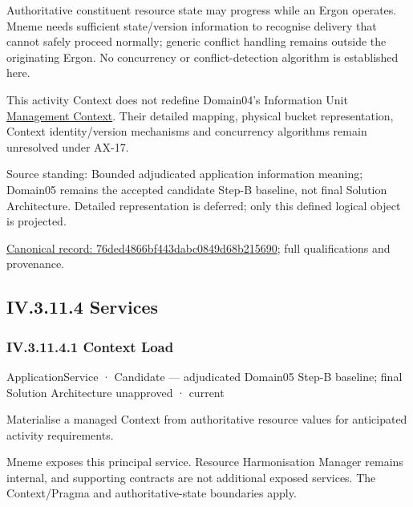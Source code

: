 Authoritative constituent resource state may progress while an Ergon operates.
Mneme needs sufficient state/version information to recognise delivery that cannot
safely proceed normally; generic conflict handling remains outside the originating
Ergon. No concurrency or conflict-detection algorithm is established here.



This activity Context does not redefine Domain04's Information Unit
\href{\detokenize{../../../../../docs/markdown/04-information-architecture/metamodel/information-architecture-metamodel.md#65-context}}{Management Context}.
Their detailed mapping, physical bucket representation, Context identity/version
mechanisms and concurrency algorithms remain unresolved under AX-17.



Source standing: Bounded adjudicated application information meaning; Domain05 remains the accepted candidate Step-B baseline, not final Solution Architecture. Detailed representation is deferred; only this defined logical object is projected.


{\footnotesize \href{../../../../continuum/application/data-object/76ded4866bf443dabc0849d68b215690.md}{Canonical record: 76ded4866bf443dabc0849d68b215690}; full qualifications and provenance.}\par
\subsection*{IV.3.11.4 Services}
\label{navigation:IV.3.11.4}

\subsubsection*{IV.3.11.4.1 Context Load}
\label{navigation:IV.3.11.4.1}

\label{element:1ccfe420541945bb9c0756a949799d95}
{\small ApplicationService · Candidate — adjudicated Domain05 Step-B baseline; final Solution Architecture unapproved · current}\par

Materialise a managed Context from authoritative resource values for anticipated activity requirements.



Mneme exposes this principal service. Resource Harmonisation Manager remains internal, and supporting contracts are not additional exposed services. The Context/Pragma and authoritative-state boundaries apply.


